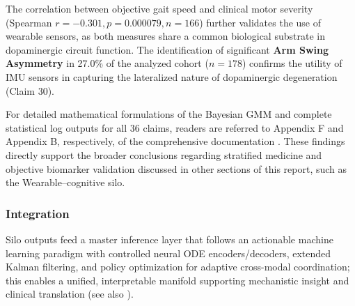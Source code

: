 \documentclass[11pt]{article}
\begin{document}
The correlation between objective gait speed and clinical motor severity (Spearman $r = -0.301, p = 0.000079, n=166$) further validates the use of wearable sensors, as both measures share a common biological substrate in dopaminergic circuit function. The identification of significant \textbf{Arm Swing Asymmetry} in 27.0\% of the analyzed cohort ($n=178$) confirms the utility of IMU sensors in capturing the lateralized nature of dopaminergic degeneration (Claim 30).

For detailed mathematical formulations of the Bayesian GMM and complete statistical log outputs for all 36 claims, readers are referred to Appendix F and Appendix B, respectively, of the comprehensive documentation \cite{tirhekar2025comprehensive}. These findings directly support the broader conclusions regarding stratified medicine and objective biomarker validation discussed in other sections of this report, such as the Wearable–cognitive silo.



\subsubsection{Integration}
Silo outputs feed a master inference layer that follows an actionable machine learning paradigm with controlled neural ODE encoders/decoders, extended Kalman filtering, and policy optimization for adaptive cross-modal coordination; this enables a unified, interpretable manifold supporting mechanistic insight and clinical translation (see also \cite{bajaj2025bayesian}).



  

\appendix
\clearpage
\end{document}
